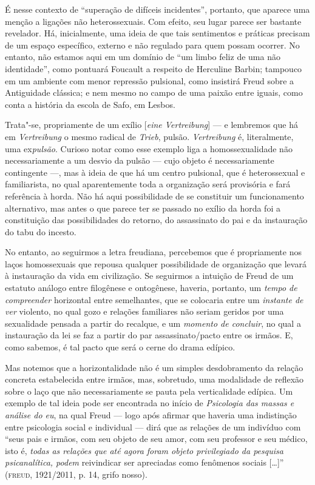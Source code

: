 É nesse contexto de ``superação de difíceis incidentes'', portanto, que
aparece uma menção a ligações não heterossexuais. Com efeito, seu lugar
parece ser bastante revelador. Há, inicialmente, uma ideia de que tais
sentimentos e práticas precisam de um espaço específico, externo e não
regulado para quem possam ocorrer. No entanto, não estamos aqui em um
domínio de ``um limbo feliz de uma não identidade'', como pontuará
Foucault a respeito de Herculine Barbin; tampouco em um ambiente com
menor repressão pulsional, como insistirá Freud sobre a Antiguidade
clássica; e nem mesmo no campo de uma paixão entre iguais, como conta a
história da escola de Safo, em Lesbos.

Trata"-se, propriamente de um exílio {[}\emph{eine Vertreibung}{]} --- e
lembremos que há em \emph{Vertreibung} o mesmo radical de \emph{Trieb},
pulsão. \emph{Vertreibung} é, literalmente, uma ex\emph{pulsão}.
Curioso notar como esse exemplo liga a homossexualidade não
necessariamente a um desvio da pulsão --- cujo objeto é necessariamente
contingente ---, mas à ideia de que há um centro pulsional, que é
heterossexual e familiarista, no qual aparentemente toda a organização
será provisória e fará referência à horda. Não há aqui possibilidade de
se constituir um funcionamento alternativo, mas antes o que parece ter
se passado no exílio da horda foi a constituição das possibilidades do
retorno, do assassinato do pai e da instauração do tabu do incesto.

No entanto, ao seguirmos a letra freudiana, percebemos que é
propriamente nos laços homossexuais que repousa qualquer possibilidade
de organização que levará à instauração da vida em civilização. Se
seguirmos a intuição de Freud de um estatuto análogo entre filogênese e
ontogênese, haveria, portanto, um \emph{tempo de compreender} horizontal
entre semelhantes, que se colocaria entre um \emph{instante de ver}
violento, no qual gozo e relações familiares não seriam geridos por uma
sexualidade pensada a partir do recalque, e um \emph{momento de
concluir}, no qual a instauração da lei se faz a partir do par
assassinato/pacto entre os irmãos. E, como sabemos, é tal pacto que será
o cerne do drama edípico.

Mas notemos que a horizontalidade não é um simples desdobramento da
relação concreta estabelecida entre irmãos, mas, sobretudo, uma
modalidade de reflexão sobre o laço que não necessariamente se pauta
pela verticalidade edípica. Um exemplo de tal ideia pode ser encontrada
no início de \emph{Psicologia das massas e análise do eu}, na qual Freud
--- logo após afirmar que haveria uma indistinção entre psicologia
social e individual --- dirá que as relações de um indivíduo com ``seus
pais e irmãos, com seu objeto de seu amor, com seu professor e seu
médico, isto é, \emph{todas as relações que até agora foram objeto
privilegiado da pesquisa psicanalítica, podem} reivindicar ser
apreciadas como fenômenos sociais {[}\ldots{}{]}'' (\textsc{freud}, 1921/2011, p. 14,
grifo nosso).

